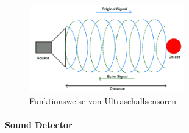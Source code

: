 \begin{figure}[H]
        \centering
        \includegraphics[width=0.6\textwidth]{images/ultraschall_prinzip.png}
        \caption{Funktionsweise von Ultraschallsensoren}
        \label{img:ultraschall_prinzip}
\end{figure}

\paragraph{Sound Detector}\mbox{}\\

